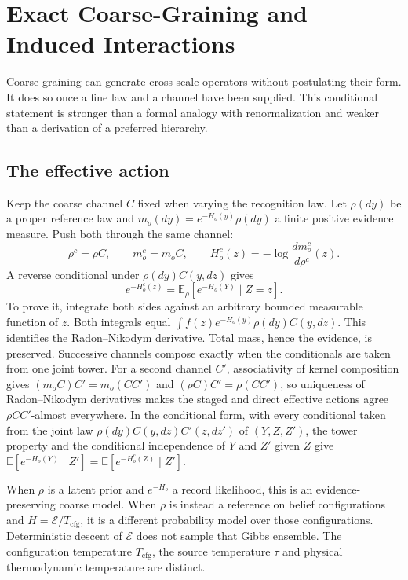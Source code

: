 \section{Exact Coarse-Graining and Induced Interactions}\label{sec:rg_status}

Coarse-graining can generate cross-scale operators without postulating their form. It does so once a fine law and a channel have been supplied. This conditional statement is stronger than a formal analogy with renormalization and weaker than a derivation of a preferred hierarchy.

\subsection{The effective action}
Keep the coarse channel $C$ fixed when varying the recognition law. Let $\rho(dy)$ be a proper reference law and $m_o(dy)=e^{-H_o(y)}\rho(dy)$ a finite positive evidence measure. Push both through the same channel:
\begin{equation}
\rho^c=\rho C,\qquad m_o^c=m_oC,\qquad
H_o^c(z)=-\log\frac{dm_o^c}{d\rho^c}(z).
\label{eq:effective_action}
\end{equation}
A reverse conditional under $\rho(dy)C(y,dz)$ gives
\begin{equation}
e^{-H_o^c(z)}=\mathbb E_\rho[e^{-H_o(Y)}\mid Z=z].
\label{eq:rg_conditional_partition}
\end{equation}
To prove it, integrate both sides against an arbitrary bounded measurable function of $z$. Both integrals equal $\int f(z)e^{-H_o(y)}\rho(dy)C(y,dz)$. This identifies the Radon--Nikodym derivative. Total mass, hence the evidence, is preserved. Successive channels compose exactly when the conditionals are taken from one joint tower. For a second channel $C'$, associativity of kernel composition gives $(m_oC)C'=m_o(CC')$ and $(\rho C)C'=\rho(CC')$, so uniqueness of Radon--Nikodym derivatives makes the staged and direct effective actions agree $\rho CC'$-almost everywhere. In the conditional form, with every conditional taken from the joint law $\rho(dy)C(y,dz)C'(z,dz')$ of $(Y,Z,Z')$, the tower property and the conditional independence of $Y$ and $Z'$ given $Z$ give $\mathbb E[e^{-H_o(Y)}\mid Z']=\mathbb E[e^{-H_o^c(Z)}\mid Z']$.

When $\rho$ is a latent prior and $e^{-H_o}$ a record likelihood, this is an evidence-preserving coarse model. When $\rho$ is instead a reference on belief configurations and $H=\mathcal E/T_{\mathrm{cfg}}$, it is a different probability model over those configurations. Deterministic descent of $\mathcal E$ does not sample that Gibbs ensemble. The configuration temperature $T_{\mathrm{cfg}}$, the source temperature $\tau$ and physical thermodynamic temperature are distinct.

